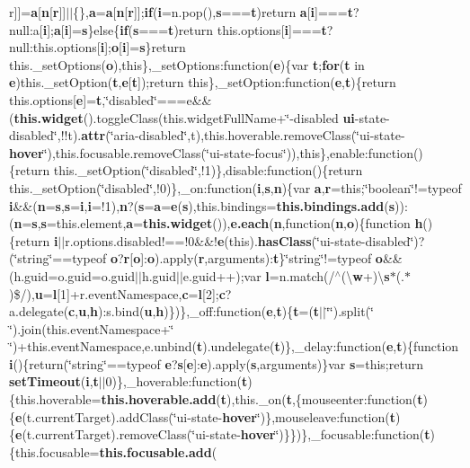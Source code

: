 {r}\mbox{]}\mbox{]}={\bf a}\mbox{[}{\bf n}\mbox{[}{\bf r}\mbox{]}\mbox{]}$\vert$$\vert$\{\},{\bf a}={\bf a}\mbox{[}{\bf n}\mbox{[}{\bf r}\mbox{]}\mbox{]};{\bf if}({\bf i}=n.\-pop(),{\bf s}==={\bf t})return {\bf a}\mbox{[}{\bf i}\mbox{]}==={\bf t}?null\-:a\mbox{[}{\bf i}\mbox{]};{\bf a}\mbox{[}{\bf i}\mbox{]}={\bf s}\}else\{{\bf if}({\bf s}==={\bf t})return this.\-options\mbox{[}{\bf i}\mbox{]}==={\bf t}?null\-:this.\-options\mbox{[}{\bf i}\mbox{]};{\bf o}\mbox{[}{\bf i}\mbox{]}={\bf s}\}return this.\-\_\-set\-Options({\bf o}),this\},\-\_\-set\-Options\-:function({\bf e})\{var {\bf t};{\bf for}({\bf t} in {\bf e})this.\-\_\-set\-Option({\bf t},{\bf e}\mbox{[}{\bf t}\mbox{]});return this\},\-\_\-set\-Option\-:function({\bf e},{\bf t})\{return this.\-options\mbox{[}{\bf e}\mbox{]}={\bf t},\char`\"{}disabled\char`\"{}===e\&\&({\bf this.\-widget}().toggle\-Class(this.\-widget\-Full\-Name+\char`\"{}-\/disabled {\bf ui}-\/state-\/disabled\char`\"{},!!t).{\bf attr}(\char`\"{}aria-\/disabled\char`\"{},t),this.\-hoverable.\-remove\-Class(\char`\"{}ui-\/state-\/{\bf hover}\char`\"{}),this.\-focusable.\-remove\-Class(\char`\"{}ui-\/state-\/focus\char`\"{})),this\},enable\-:function()\{return this.\-\_\-set\-Option(\char`\"{}disabled\char`\"{},!1)\},disable\-:function()\{return this.\-\_\-set\-Option(\char`\"{}disabled\char`\"{},!0)\},\-\_\-on\-:function({\bf i},{\bf s},{\bf n})\{var {\bf a},{\bf r}=this;\char`\"{}boolean\char`\"{}!=typeof {\bf i}\&\&({\bf n}={\bf s},{\bf s}={\bf i},{\bf i}=!1),{\bf n}?({\bf s}={\bf a}={\bf e}({\bf s}),this.\-bindings={\bf this.\-bindings.\-add}({\bf s}))\-:({\bf n}={\bf s},{\bf s}=this.\-element,{\bf a}={\bf this.\-widget}()),{\bf e.\-each}({\bf n},function({\bf n},{\bf o})\{function {\bf h}()\{return {\bf i}$\vert$$\vert$r.\-options.\-disabled!==!0\&\&!{\bf e}(this).{\bf has\-Class}(\char`\"{}ui-\/state-\/disabled\char`\"{})?(\char`\"{}string\char`\"{}==typeof {\bf o}?{\bf r}\mbox{[}{\bf o}\mbox{]}\-:{\bf o}).apply({\bf r},arguments)\-:{\bf t}\}\char`\"{}string\char`\"{}!=typeof {\bf o}\&\&(h.\-guid=o.\-guid=o.\-guid$\vert$$\vert$h.\-guid$\vert$$\vert$e.\-guid++);var {\bf l}=n.\-match(/$^\wedge$(\textbackslash{}{\bf w}+)\textbackslash{}{\bf s}$\ast$(.$\ast$)\$/),{\bf u}={\bf l}\mbox{[}1\mbox{]}+r.\-event\-Namespace,{\bf c}={\bf l}\mbox{[}2\mbox{]};{\bf c}?a.\-delegate({\bf c},{\bf u},{\bf h})\-:s.\-bind({\bf u},{\bf h})\})\},\-\_\-off\-:function({\bf e},{\bf t})\{{\bf t}=({\bf t}$\vert$$\vert$\char`\"{}\char`\"{}).split(\char`\"{} \char`\"{}).join(this.\-event\-Namespace+\char`\"{} \char`\"{})+this.\-event\-Namespace,e.\-unbind({\bf t}).undelegate({\bf t})\},\-\_\-delay\-:function({\bf e},{\bf t})\{function {\bf i}()\{return(\char`\"{}string\char`\"{}==typeof {\bf e}?{\bf s}\mbox{[}{\bf e}\mbox{]}\-:{\bf e}).apply({\bf s},arguments)\}var {\bf s}=this;return {\bf set\-Timeout}({\bf i},{\bf t}$\vert$$\vert$0)\},\-\_\-hoverable\-:function({\bf t})\{this.\-hoverable={\bf this.\-hoverable.\-add}({\bf t}),this.\-\_\-on({\bf t},\{mouseenter\-:function({\bf t})\{{\bf e}(t.\-current\-Target).add\-Class(\char`\"{}ui-\/state-\/{\bf hover}\char`\"{})\},mouseleave\-:function({\bf t})\{{\bf e}(t.\-current\-Target).remove\-Class(\char`\"{}ui-\/state-\/{\bf hover}\char`\"{})\}\})\},\-\_\-focusable\-:function({\bf t})\{this.\-focusable={\bf this.\-focusable.\-add}({\bf }
